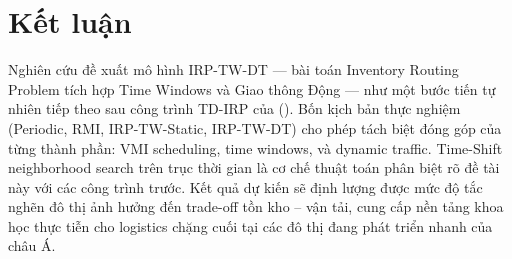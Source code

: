\documentclass[12pt,a4paper]{article}
\newcommand{\citealias}[1]{\citeauthor{#1} (\citeyear{#1})}
\begin{document}
\section{Kết luận}

Nghiên cứu đề xuất mô hình IRP-TW-DT --- bài toán Inventory Routing Problem tích hợp
Time Windows và Giao thông Động --- như một bước tiến tự nhiên tiếp theo sau công trình
TD-IRP của \citealias{touzout2022assign}. Bốn kịch bản thực nghiệm (Periodic, RMI,
IRP-TW-Static, IRP-TW-DT) cho phép tách biệt đóng góp của từng thành phần: VMI scheduling,
time windows, và dynamic traffic. Time-Shift neighborhood search trên trục thời gian là
cơ chế thuật toán phân biệt rõ đề tài này với các công trình trước. Kết quả dự kiến sẽ
định lượng được mức độ tắc nghẽn đô thị ảnh hưởng đến trade-off tồn kho -- vận tải,
cung cấp nền tảng khoa học thực tiễn cho logistics chặng cuối tại các đô thị đang phát
triển nhanh của châu Á.

\newpage

\end{document}
